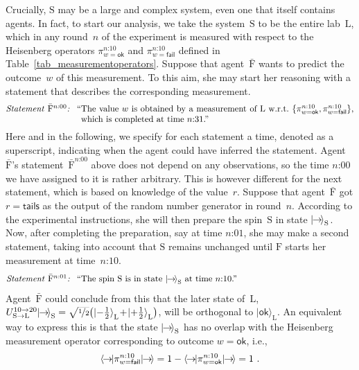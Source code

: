 \documentclass[12pt]{article}
\theoremstyle{mystyle}
\theoremstyle{definition}
\newcommand*{\ket}[1]{{| #1 \rangle}}
\newcommand*{\bra}[1]{{\langle #1 |}}
\newcommand*{\Friendone}{\mathrm{\bar{F}}}
\newcommand*{\Friendtwo}{\mathrm{F}}
\newcommand*{\Labtwo}{\mathrm{L}}
\newcommand*{\System}{\mathrm{S}}
\newcommand*{\Spin}{\mathrm{S}}
\newcommand*{\spinright}{\ket{{\hspace{-0.2ex}\rightarrow\hspace{-0.4ex}}}}
\newcommand*{\spinrightb}{\bra{{\hspace{-0.3ex}\rightarrow\hspace{-0.3ex}}}}
\newcommand*{\sminus}{{\textstyle - \frac{1}{2}}}
\newcommand*{\splus}{{\textstyle + \frac{1}{2}}}
\newcommand*{\ok}{\mathsf{ok}}
\newcommand*{\fail}{\mathsf{fail}}
\newcommand*{\tail}{\mathsf{tails}}
\newcommand*{\asn}[1]{``#1''}
\newcommand*{\sT}[1]{{\text{\emph{Statement} $#1$\emph{:} }}}
\newcommand*{\sTM}[1]{\begin{minipage}{14cm} \hangindent=8.6em  #1 \end{minipage}}
\begin{document}
Crucially, $\System$ may be a large and complex system,  even one that itself contains agents. In fact, to start our analysis, we take the system~$\System$ to be  the  entire lab~$\Labtwo$, which in any round~$n$ of the experiment is measured  with respect to the  Heisenberg operators  $\pi^{\text{$n$:10}}_{w=\ok}$ and $\pi^{\text{$n$:10}}_{w=\fail}$ defined in Table~\ref{tab_measurementoperators}.  Suppose that agent~$\Friendone$ wants to predict the outcome~$w$ of this measurement. To this aim, she may start her reasoning with a statement that describes the corresponding measurement. 
\begin{align*}
  \sTM{\sT{\Friendone^{\text{$n$:00}}} \asn{The value $w$ is obtained by a measurement of $\Labtwo$  w.r.t.\ $\{\pi^{\text{$n$:10}}_{w=\ok},  \pi^{\text{$n$:10}}_{w=\fail}\}$, which is completed at time $\text{$n$:31}$.}}
\end{align*}
Here and in the following, we specify for each statement a time, denoted as a superscript, indicating when the agent could have inferred the statement.  Agent $\Friendone$'s statement~$\Friendone^{\text{$n$:00}}$ above does not depend on any observations, so the time $\text{$n$:00}$ we have assigned to it is rather arbitrary.  This is however different for the next statement, which is based on knowledge of the value~$r$.  Suppose that agent~$\Friendone$ got $r=\tail$ as the output of the random number generator in round~$n$. According to the experimental instructions, she will then prepare the spin~$\Spin$ in state $\spinright_{\Spin}$. Now, after completing the preparation, say at time $\text{$n$:01}$, she may make a second statement, taking into account that $\Spin$ remains unchanged until $\Friendtwo$ starts her measurement at time~$\text{$n$:10}$.
\begin{align*}
  \sTM{\sT{{\Friendone}^{\text{$n$:01}}}  \asn{The spin $\System$ is in state~$\spinright_{\Spin}$ at time $\text{$n$:10}$.}} 
\end{align*}
Agent~$\Friendone$ could conclude from this that the   later state of~$\Labtwo$, $U_{\Spin \to \Labtwo}^{\text{10} \to \text{20}}  \spinright_{\Spin} =\smash{\sqrt{\nicefrac{1}{2}} \bigl(\ket{\sminus}_{\Labtwo} \! + \!  \ket{\splus}_{\Labtwo}\bigr)}$,  will be orthogonal to $\ket{\ok}_{\Labtwo}$. An equivalent way to express this is that the state $\spinright_{\Spin}$ has no overlap with the  Heisenberg measurement operator corresponding to outcome $w=\ok$, i.e., 
 \begin{align}
\spinrightb \pi_{w=\fail}^{\text{$n$:10}} \spinright 
= 1 - \spinrightb \pi^{\text{$n$:10}}_{w=\ok} \spinright 
= 1 \ . \label{eq_Foneargument}
\end{align}
\end{document}
